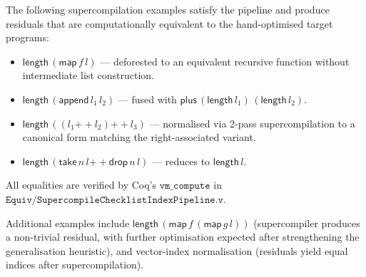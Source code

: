 \begin{proposition}
\label{prop:examples}
The following supercompilation examples satisfy the pipeline and produce residuals that are computationally equivalent to the hand-optimised target programs:
\begin{itemize}[leftmargin=*]
\item $\mathsf{length}\,(\mathsf{map}\,f\,l)$ --- deforested to an equivalent recursive function without intermediate list construction.
\item $\mathsf{length}\,(\mathsf{append}\,l_1\,l_2)$ --- fused with $\mathsf{plus}\,(\mathsf{length}\,l_1)\,(\mathsf{length}\,l_2)$.
\item $\mathsf{length}\,((l_1 \mathbin{++} l_2) \mathbin{++} l_3)$ --- normalised via 2-pass supercompilation to a canonical form matching the right-associated variant.
\item $\mathsf{length}\,(\mathsf{take}\,n\,l \mathbin{++} \mathsf{drop}\,n\,l)$ --- reduces to $\mathsf{length}\,l$.
\end{itemize}
All equalities are verified by Coq's $\mathtt{vm\_compute}$ in $\texttt{Equiv/SupercompileChecklistIndexPipeline.v}$.
\end{proposition}

Additional examples include $\mathsf{length}\,(\mathsf{map}\,f\,(\mathsf{map}\,g\,l))$ (supercompiler produces a non-trivial residual, with further optimisation expected after strengthening the generalisation heuristic), and vector-index normalisation (residuals yield equal indices after supercompilation).
